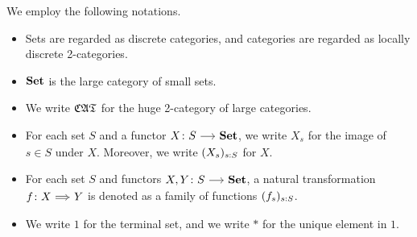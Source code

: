 \documentclass[a4paper,dvipsnames, 11pt]{amsart}
\begin{document}
\maketitle
\begin{notation}
	We employ the following notations.
	\begin{itemize}
		\item %
			Sets are regarded as discrete categories,
			and categories are regarded as locally discrete 2-categories.
		\item %
			$\mathbf{Set}$ is the large category of small sets.
		\item %
			We write ${\mathfrak{CAT}}$ for the huge 2-category of large categories.
		\item %
			For each set $S$ and a functor $X\colon S\arr\Set$,
			we write $X_s$ for the image of $s\in S$ under $X$.
			Moreover, we write $(X_s)_{s: S}$ for $X$.
		\item %
			For each set $S$ and functors $X,Y\colon S\arr \Set$,
			a natural transformation $f\colon X \arr[Rightarrow]Y$ is denoted as a family of functions
			$(f_s)_{s: S}$.
		\item %
			We write $1$ for the terminal set, and we write $*$ for the unique element in $1$.
	\end{itemize}
\end{notation}
\end{document}
